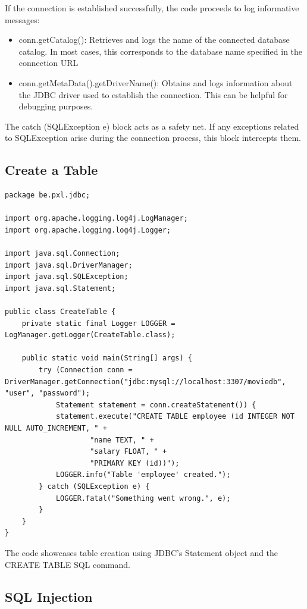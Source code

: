 If the connection is established successfully, the code proceeds to log informative messages:

\begin{itemize}
\item conn.getCatalog(): Retrieves and logs the name of the connected database catalog. In most cases, this corresponds to the database name specified in the connection URL 
\item conn.getMetaData().getDriverName(): Obtains and logs information about the JDBC driver used to establish the connection. This can be helpful for debugging purposes.
\end{itemize}


The catch (SQLException e) block acts as a safety net. If any exceptions related to SQLException arise during the connection process, this block intercepts them.

\subsection{Create a Table}

\begin{lstlisting}
package be.pxl.jdbc;

import org.apache.logging.log4j.LogManager;
import org.apache.logging.log4j.Logger;

import java.sql.Connection;
import java.sql.DriverManager;
import java.sql.SQLException;
import java.sql.Statement;

public class CreateTable {
	private static final Logger LOGGER = LogManager.getLogger(CreateTable.class);

    public static void main(String[] args) {
        try (Connection conn = DriverManager.getConnection("jdbc:mysql://localhost:3307/moviedb", "user", "password");
            Statement statement = conn.createStatement()) {
            statement.execute("CREATE TABLE employee (id INTEGER NOT NULL AUTO_INCREMENT, " +
		            "name TEXT, " +
		            "salary FLOAT, " +
		            "PRIMARY KEY (id))");
            LOGGER.info("Table 'employee' created.");
        } catch (SQLException e) {
            LOGGER.fatal("Something went wrong.", e);
        }
    }
}
\end{lstlisting}

The code showcases table creation using JDBC's Statement object and the CREATE TABLE SQL command.

\subsection{SQL Injection}


